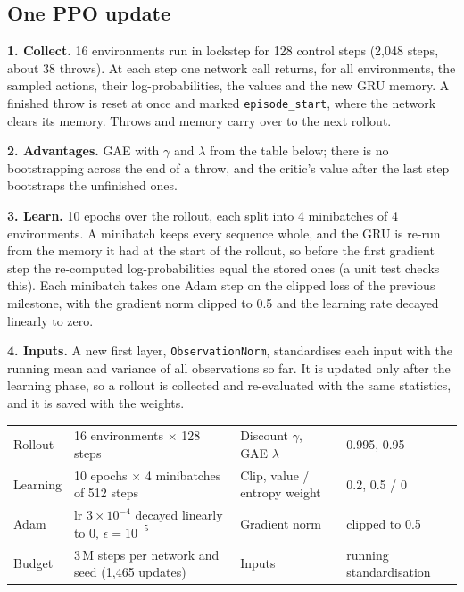 \documentclass[10pt,a4paper]{article}
\newcommand{\code}[1]{\texttt{#1}}
\begin{document}
\subsection{One PPO update}

\textbf{1. Collect.} 16 environments run in lockstep for 128 control steps (2{,}048 steps, about 38
throws). At each step one network call returns, for all environments, the sampled actions, their
log-probabilities, the values and the new GRU memory. A finished throw is reset at once and marked
\code{episode\_start}, where the network clears its memory. Throws and memory carry over to the next rollout.

\textbf{2. Advantages.} GAE with $\gamma$ and $\lambda$ from the table below; there is no bootstrapping
across the end of a throw, and the critic's value after the last step bootstraps the unfinished ones.

\textbf{3. Learn.} 10 epochs over the rollout, each split into 4 minibatches of 4 environments.
A minibatch keeps every sequence whole, and the GRU is re-run from the memory it had at the start of the
rollout, so before the first gradient step the re-computed log-probabilities equal the stored ones
(a unit test checks this). Each minibatch takes one Adam step on the clipped loss of the previous
milestone, with the gradient norm clipped to 0.5 and the learning rate decayed linearly to zero.

\textbf{4. Inputs.} A new first layer, \code{ObservationNorm}, standardises each input with the running mean
and variance of all observations so far. It is updated only after the learning phase, so a rollout is
collected and re-evaluated with the same statistics, and it is saved with the weights.

{\small
\begin{tabularx}{\textwidth}{@{}lX|lX@{}}
  \toprule
  Rollout  & 16 environments $\times$ 128 steps            & Discount $\gamma$, GAE $\lambda$ & 0.995, 0.95 \\
  Learning & 10 epochs $\times$ 4 minibatches of 512 steps & Clip, value / entropy weight     & 0.2, 0.5 / 0 \\
  Adam     & lr $3\times10^{-4}$ decayed linearly to 0, $\epsilon = 10^{-5}$ & Gradient norm & clipped to 0.5 \\
  Budget   & 3\,M steps per network and seed (1{,}465 updates)      & Inputs                           & running standardisation \\
  \bottomrule
\end{tabularx}
}
\end{document}
